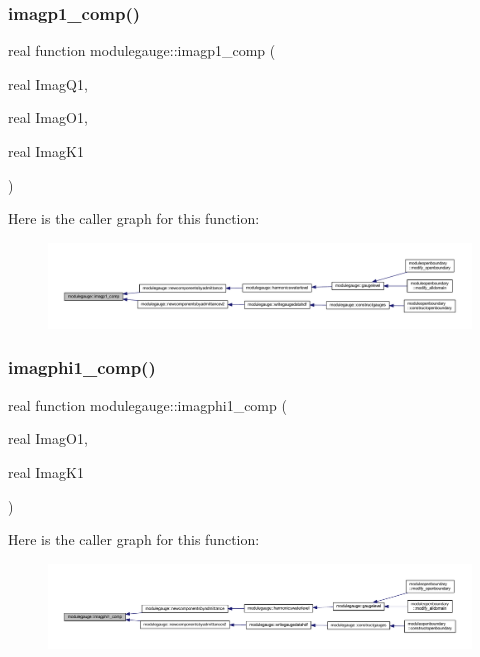 \subsubsection{\texorpdfstring{imagp1\+\_\+comp()}{imagp1\_comp()}}
{\footnotesize\ttfamily real function modulegauge\+::imagp1\+\_\+comp (\begin{DoxyParamCaption}\item[{real}]{Imag\+Q1,  }\item[{real}]{Imag\+O1,  }\item[{real}]{Imag\+K1 }\end{DoxyParamCaption})\hspace{0.3cm}{\ttfamily [private]}}

Here is the caller graph for this function\+:\nopagebreak
\begin{figure}[H]
\begin{center}
\leavevmode
\includegraphics[width=350pt]{namespacemodulegauge_a45d6d9badd92c973e90b945525d4c23e_icgraph}
\end{center}
\end{figure}
\mbox{\label{namespacemodulegauge_a0d65a34744a9e60a2568d7e627a69831}} 
\subsubsection{\texorpdfstring{imagphi1\+\_\+comp()}{imagphi1\_comp()}}
{\footnotesize\ttfamily real function modulegauge\+::imagphi1\+\_\+comp (\begin{DoxyParamCaption}\item[{real}]{Imag\+O1,  }\item[{real}]{Imag\+K1 }\end{DoxyParamCaption})\hspace{0.3cm}{\ttfamily [private]}}

Here is the caller graph for this function\+:\nopagebreak
\begin{figure}[H]
\begin{center}
\leavevmode
\includegraphics[width=350pt]{namespacemodulegauge_a0d65a34744a9e60a2568d7e627a69831_icgraph}
\end{center}
\end{figure}
\mbox{\label{namespacemodulegauge_a71b5d5333c564a3344645bef85a9e75b}} 

